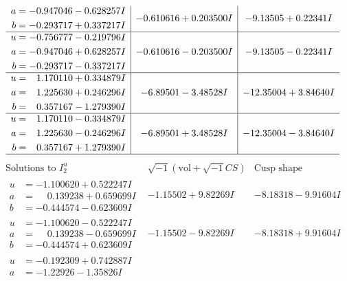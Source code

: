 \documentclass[1p]{elsarticle_modified}
\theoremstyle{definition}
\newcommand{\I}{\sqrt{-1}}
\begin{document}
$$\begin{array}{c|c|c}
\begin{aligned}
a &= -0.947046 - 0.628257 I \\
b &= -0.293717 + 0.337217 I\end{aligned}
 & -0.610616 + 0.203500 I & -9.13505 + 0.22341 I \\ \hline\begin{aligned}
u &= -0.756777 - 0.219796 I \\
a &= -0.947046 + 0.628257 I \\
b &= -0.293717 - 0.337217 I\end{aligned}
 & -0.610616 - 0.203500 I & -9.13505 - 0.22341 I \\ \hline\begin{aligned}
u &= \phantom{-}1.170110 + 0.334879 I \\
a &= \phantom{-}1.225630 + 0.246296 I \\
b &= \phantom{-}0.357167 - 1.279390 I\end{aligned}
 & -6.89501 - 3.48528 I & -12.35004 + 3.84640 I \\ \hline\begin{aligned}
u &= \phantom{-}1.170110 - 0.334879 I \\
a &= \phantom{-}1.225630 - 0.246296 I \\
b &= \phantom{-}0.357167 + 1.279390 I\end{aligned}
 & -6.89501 + 3.48528 I & -12.35004 - 3.84640 I\\
 \hline 
 \end{array}$$\newpage$$\begin{array}{c|c|c}  
\text{Solutions to }I^u_{2}& \I (\text{vol} + \sqrt{-1}CS) & \text{Cusp shape}\\
 \hline 
\begin{aligned}
u &= -1.100620 + 0.522247 I \\
a &= \phantom{-}0.139238 + 0.659699 I \\
b &= -0.444574 - 0.623609 I\end{aligned}
 & -1.15502 + 9.82269 I & -8.18318 - 9.91604 I \\ \hline\begin{aligned}
u &= -1.100620 - 0.522247 I \\
a &= \phantom{-}0.139238 - 0.659699 I \\
b &= -0.444574 + 0.623609 I\end{aligned}
 & -1.15502 - 9.82269 I & -8.18318 + 9.91604 I \\ \hline\begin{aligned}
u &= -0.192309 + 0.742887 I \\
a &= -1.22926 - 1.35826 I \\

\end{aligned}
\end{array}$$
\end{document}
